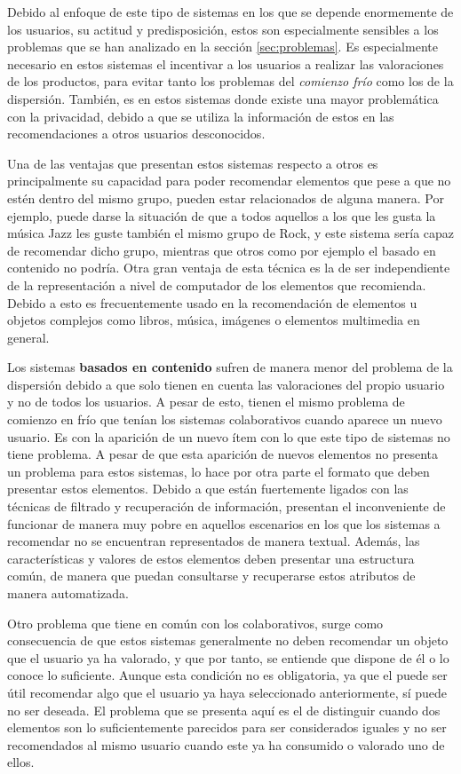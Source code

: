 Debido al enfoque de este tipo de sistemas en los que se depende enormemente de los usuarios, su actitud y predisposición, estos son especialmente sensibles a los problemas que se han analizado en la sección \ref{sec:problemas}. Es especialmente necesario en estos sistemas el incentivar a los usuarios a realizar las valoraciones de los productos, para evitar tanto los problemas del \textit{comienzo frío} como los de la dispersión. También, es en estos sistemas donde existe una mayor problemática con la privacidad, debido a que se utiliza la información de estos en las recomendaciones a otros usuarios desconocidos.

Una de las ventajas que presentan estos sistemas respecto a otros es principalmente su capacidad para poder recomendar elementos que pese a que no estén dentro del mismo grupo, pueden estar relacionados de alguna manera. Por ejemplo, puede darse la situación de que a todos aquellos a los que les gusta la música Jazz les guste también el mismo grupo de Rock, y este sistema sería capaz de recomendar dicho grupo, mientras que otros como por ejemplo el basado en contenido no podría. Otra gran ventaja de esta técnica es la de ser independiente de la representación a nivel de computador de los elementos que recomienda. Debido a esto es frecuentemente usado en la recomendación de elementos u objetos complejos como libros, música, imágenes o elementos multimedia en general.

Los sistemas \textbf{basados en contenido} sufren de manera menor del problema de la dispersión debido a que solo tienen en cuenta las valoraciones del propio usuario y no de todos los usuarios. A pesar de esto, tienen el mismo problema de comienzo en frío que tenían los sistemas colaborativos cuando aparece un nuevo usuario. Es con la aparición de un nuevo ítem con lo que este tipo de sistemas no tiene problema. A pesar de que esta aparición de nuevos elementos no presenta un problema para estos sistemas, lo hace por otra parte el formato que deben presentar estos elementos. Debido a que están fuertemente ligados con las técnicas de filtrado y recuperación de información, presentan el inconveniente de funcionar de manera muy pobre en aquellos escenarios en los que los sistemas a recomendar no se encuentran representados de manera textual. Además, las características y valores de estos elementos deben presentar una estructura común, de manera que puedan consultarse y recuperarse estos atributos de manera automatizada. 

Otro problema que tiene en común con los colaborativos, surge como consecuencia de que estos sistemas generalmente no deben recomendar un objeto que el usuario ya ha valorado, y que por tanto, se entiende que dispone de él o lo conoce lo suficiente. Aunque esta condición no es obligatoria, ya que el puede ser útil recomendar algo que el usuario ya haya seleccionado anteriormente, sí puede no ser deseada. El problema que se presenta aquí es el de distinguir cuando dos elementos son lo suficientemente parecidos para ser considerados iguales y no ser recomendados al mismo usuario cuando este ya ha consumido o valorado uno de ellos.

